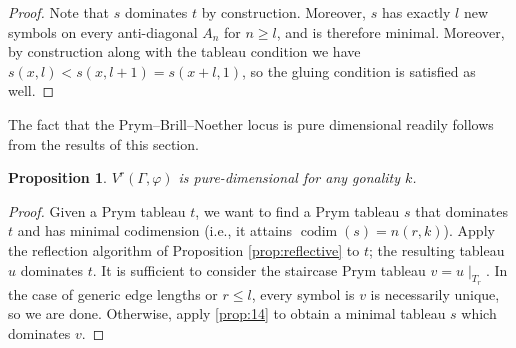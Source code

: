 \documentclass[11pt,reqno]{amsart}
\newcommand*{\restrict}[1]{{\mid}_{#1}}
\DeclareMathOperator{\codim}{codim}
\theoremstyle{definition}
\theoremstyle{problem}
\theoremstyle{plain}
\newtheorem{proposition}[definition]{Proposition}
\theoremstyle{remark}
\theoremstyle{theorem}
\numberwithin{equation}{section}
\numberwithin{figure}{section}
\theoremstyle{definition}
\theoremstyle{problem}
\theoremstyle{plain}
\begin{document}
\begin{proof}
    Note that $s$ dominates $t$ by construction. Moreover, $s$ has
  exactly $l$ new symbols on every anti-diagonal $A_n$ for $n\geq l$,
  and is therefore minimal.  Moreover, by construction along with the tableau condition we have $s(x,l)< s(x,l+1)=s(x+l,1)$, so the gluing condition is satisfied as well.
\end{proof}

The fact that the Prym--Brill--Noether  locus is pure dimensional readily follows from the results of this section. 

\begin{proposition}\label{thm:pure-dim}
	$V^r(\Gamma,\varphi)$ is pure-dimensional for any gonality $k$.
\end{proposition}

\begin{proof}
	Given a Prym tableau $t$, we want to find a Prym tableau $s$ that
	dominates $t$ and has minimal codimension (i.e., it attains
	$\codim(s) = n(r,k)$).  Apply the reflection algorithm of
	Proposition \ref{prop:reflective} to $t$; the resulting tableau $u$
	dominates $t$.
	It is sufficient to consider the staircase Prym tableau
	$v = u\restrict{T_r}$.  In the case of generic edge lengths or
	$r \leq l$, every symbol is $v$ is necessarily unique, so we are
	done.  Otherwise, apply \cref{prop:14} to obtain a minimal tableau
	$s$ which dominates $v$.
\end{proof}
\end{document}

